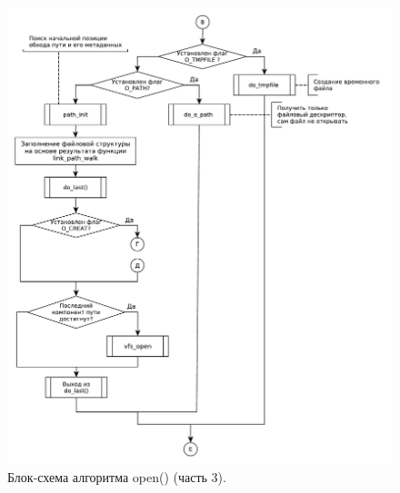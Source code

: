 \begin{figure}[H]
    \centering
    \includegraphics[scale=0.6]{data/newpdg/open_03_tryrolaned.pdf}
    \caption{Блок-схема алгоритма open() (часть 3).}
\end{figure}

